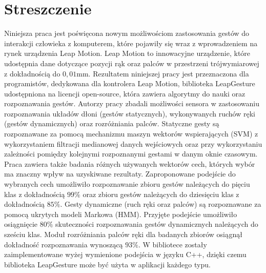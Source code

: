 \chapter*{Streszczenie}
Niniejsza praca jest poświęcona nowym możliwościom zastosowania gestów do interakcji człowieka z komputerem, które pojawiły się wraz z wprowadzeniem na rynek urządzenia Leap Motion.
Leap Motion to innowacyjne urządzenie, które udostępnia dane dotyczące pozycji rąk oraz palców w przestrzeni trójwymiarowej z dokładnością do $0,01$mm.
Rezultatem niniejszej pracy jest przeznaczona dla programistów, dedykowana dla kontrolera Leap Motion, biblioteka LeapGesture udostępniona na licencji open-source, która zawiera algorytmy do nauki oraz rozpoznawania gestów.
Autorzy pracy zbadali możliwości sensora w zastosowaniu rozpoznawania układów dłoni (gestów statycznych), wykonywanych ruchów ręki (gestów dynamicznych) oraz rozróżniania palców.
Statyczne gesty są rozpoznawane za pomocą mechanizmu maszyn wektorów wspierających (SVM) z wykorzystaniem filtracji medianowej danych wejściowych oraz przy wykorzystaniu zależności pomiędzy kolejnymi rozpoznanymi gestami w danym oknie czasowym.
Praca zawiera także badania różnych używanych wektorów cech, których wybór ma znaczny wpływ na uzyskiwane rezultaty.
Zaproponowane podejście do wybranych cech umożliwiło rozpoznawanie zbioru gestów należących do pięciu klas z dokładnością $99\%$ oraz zbioru gestów należących do dziesięciu klas z dokładnością $85\%$.
Gesty dynamiczne (ruch ręki oraz palców) są rozpoznawane za pomocą ukrytych modeli Markowa (HMM).
Przyjęte podejście umożliwiło osiągnięcie $80\%$ skuteczności rozpoznawania gestów dynamicznych należących do sześciu klas.
Moduł rozróżniania palców ręki dla badanych zbiorów osiągnął dokładność rozpoznawania wynoszącą $93\%$. 
W bibliotece zostały zaimplementowane wyżej wymienione podejścia w języku C++, dzięki czemu biblioteka LeapGesture może być użyta w aplikacji każdego typu.

